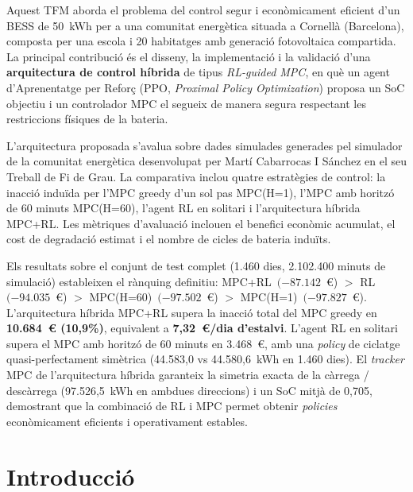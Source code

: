 \documentclass[a4paper,12pt,twoside]{ThesisStyle}
\begin{document}
Aquest TFM aborda el problema del control segur i econòmicament eficient d'un BESS de 50~kWh per a una comunitat energètica situada a Cornellà (Barcelona), composta per una escola i 20 habitatges amb generació fotovoltaica compartida. La principal contribució és el disseny, la implementació i la validació d'una \textbf{arquitectura de control híbrida} de tipus \textit{RL-guided MPC}, en què un agent d'Aprenentatge per Reforç (PPO, \textit{Proximal Policy Optimization}) proposa un SoC objectiu i un controlador MPC el segueix de manera segura respectant les restriccions físiques de la bateria.

L'arquitectura proposada s'avalua sobre dades simulades generades pel simulador de la comunitat energètica desenvolupat per Martí Cabarrocas I Sánchez en el seu Treball de Fi de Grau. La comparativa inclou quatre estratègies de control: la inacció induïda per l'MPC greedy d'un sol pas MPC(H=1), l'MPC amb horitzó de 60 minuts MPC(H=60), l'agent RL en solitari i l'arquitectura híbrida MPC+RL. Les mètriques d'avaluació inclouen el benefici econòmic acumulat, el cost de degradació estimat i el nombre de cicles de bateria induïts.

Els resultats sobre el conjunt de test complet (1.460 dies, 2.102.400 minuts de simulació) estableixen el rànquing definitiu: MPC+RL~$(-87.142$~€) $>$ RL~$(-94.035$~€) $>$ MPC(H=60)~$(-97.502$~€) $>$ MPC(H=1)~$(-97.827$~€). L'arquitectura híbrida MPC+RL supera la inacció total del MPC greedy en \textbf{10.684~€ (10,9\%)}, equivalent a \textbf{7,32~€/dia d'estalvi}. L'agent RL en solitari supera el MPC amb horitzó de 60 minuts en 3.468~€, amb una \textit{policy} de ciclatge quasi-perfectament simètrica (44.583,0 vs 44.580,6~kWh en 1.460 dies). El \textit{tracker} MPC de l'arquitectura híbrida garanteix la simetria exacta de la càrrega / descàrrega (97.526,5~kWh en ambdues direccions) i un SoC mitjà de 0,705, demostrant que la combinació de RL i MPC permet obtenir \textit{policies} econòmicament eficients i operativament estables.

\tableofcontents
\listoffigures
\listoftables

\mainmatter

\chapter{Introducció}
\label{cap:intro}
\end{document}
